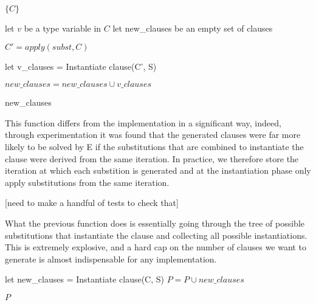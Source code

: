 \documentclass{article}
\begin{document}
\begin{algorithm}
\begin{algorithmic}[1]


      \State \Return \(\{C\}\)

   \Else

      \State let \(v\) be a type variable in \(C\)
      \State let new\_clauses be an empty set of clauses



            \State \(C' = apply(subst, C)\)

            \State let v\_clauses = Instantiate clause(C', S)

         \EndIf

         \State \( new\_clauses = new\_clauses \cup v\_clauses\)

      \EndFor

      \State \Return new\_clauses
   \EndIf

\EndFunction
\end{algorithmic}
\end{algorithm}
This function differs from the implementation in a significant way, indeed, through experimentation it was found that the generated clauses were far more likely to be solved by E if the substitutions that are combined to instantiate the clause were derived from the same iteration. In practice, we therefore store the iteration at which each substition is generated and at the instantiation phase only apply substitutions from the same iteration.

[need to make a handful of tests to check that]

What the previous function does is essentially going through the tree of possible substitutions that instantiate the clause and collecting all possible instantiations. This is extremely explosive, and a hard cap on the number of clauses we want to generate is almost indispensable for any implementation.

\begin{algorithm}
\begin{algorithmic}[1]

   \State let new\_clauses = Instantiate clause(C, S)
   \State \(P = P \cup new\_clauses\)
\EndFor

\State \Return \(P\)

\EndFunction
\end{algorithmic}
\end{algorithm}
\end{document}
